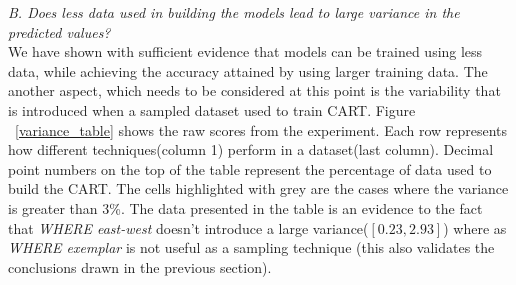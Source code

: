 \documentclass{sig-alternative}
\begin{document}




\textit{B. Does less data used in building the models lead to large
variance in the predicted values?}\\

We have shown with sufficient evidence that models can be trained using less data, while achieving the accuracy
attained by using larger training data. 
The another aspect, which needs to be considered at this point is the variability that is introduced  when a sampled dataset used to train CART. 
Figure ~\ref{variance_table} shows the raw scores from the experiment. Each row represents how different techniques(column 1) perform in a dataset(last column). Decimal point numbers on the top of the table represent the percentage of data used to build the CART. The cells highlighted with grey are the cases where the variance is greater than 3\%. The data presented in the table is an evidence to the fact  that \textit{WHERE east-west} doesn't introduce a large variance($[0.23, 2.93]$) where as \textit{WHERE exemplar} is not useful as a sampling technique (this also validates the conclusions drawn in the previous section). 
\end{document}
